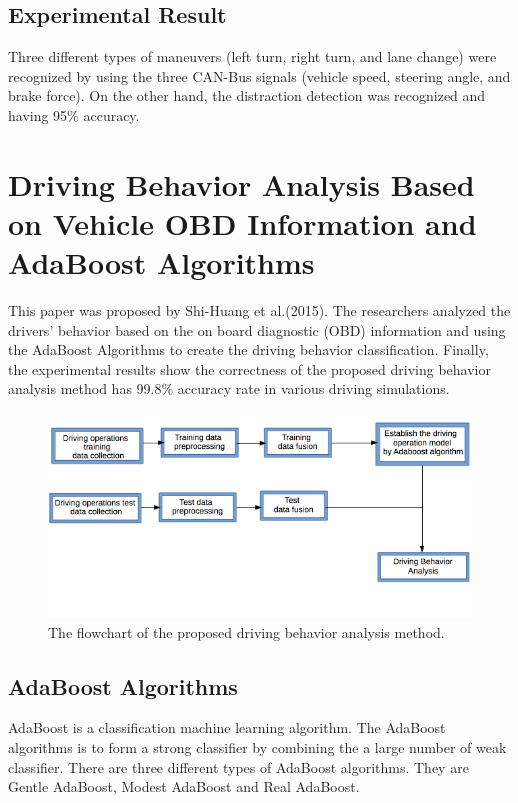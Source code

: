 \subsection{Experimental Result}
Three different types of maneuvers (left turn, right turn, and lane change) were recognized by using the three CAN-Bus signals (vehicle speed, steering angle, and brake force). On the other hand, the distraction detection was recognized and having 95\% accuracy.


\section{Driving Behavior Analysis Based on Vehicle OBD Information and AdaBoost Algorithms}
This paper was proposed by Shi-Huang et al.(2015). The researchers analyzed the drivers' behavior based on the on board diagnostic (OBD) information and using the AdaBoost Algorithms to create the driving  behavior classification. Finally, the experimental results show the correctness of the proposed driving behavior analysis method has 99.8\% accuracy rate in various driving simulations.

\begin{figure}[hbt!]\centering
\includegraphics[width=.75\textwidth]{image/adaboost_flowchart}
\caption{The flowchart of the proposed driving behavior analysis method.}
\end{figure}

\subsection{AdaBoost Algorithms}
AdaBoost is a classification machine learning algorithm. The AdaBoost algorithms is to form a strong classifier by combining the a large number of weak classifier. There are three different types of AdaBoost algorithms. They are Gentle AdaBoost, Modest AdaBoost and Real AdaBoost.

